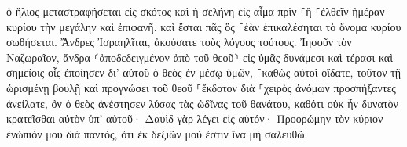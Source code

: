 \documentclass{openreader}
\begin{document}
ὁ ἥλιος μεταστραφήσεται εἰς σκότος καὶ ἡ σελήνη εἰς αἷμα πρὶν ⸀ἢ ⸀ἐλθεῖν ἡμέραν κυρίου τὴν μεγάλην καὶ ἐπιφανῆ. 
καὶ ἔσται πᾶς ὃς ⸀ἐὰν ἐπικαλέσηται τὸ ὄνομα κυρίου σωθήσεται. 
Ἄνδρες Ἰσραηλῖται, ἀκούσατε τοὺς λόγους τούτους. Ἰησοῦν τὸν Ναζωραῖον, ἄνδρα ⸂ἀποδεδειγμένον ἀπὸ τοῦ θεοῦ⸃ εἰς ὑμᾶς δυνάμεσι καὶ τέρασι καὶ σημείοις οἷς ἐποίησεν δι’ αὐτοῦ ὁ θεὸς ἐν μέσῳ ὑμῶν, ⸀καθὼς αὐτοὶ οἴδατε, 
τοῦτον τῇ ὡρισμένῃ βουλῇ καὶ προγνώσει τοῦ θεοῦ ⸀ἔκδοτον διὰ ⸀χειρὸς ἀνόμων προσπήξαντες ἀνείλατε, 
ὃν ὁ θεὸς ἀνέστησεν λύσας τὰς ὠδῖνας τοῦ θανάτου, καθότι οὐκ ἦν δυνατὸν κρατεῖσθαι αὐτὸν ὑπ’ αὐτοῦ· 
Δαυὶδ γὰρ λέγει εἰς αὐτόν· Προορώμην τὸν κύριον ἐνώπιόν μου διὰ παντός, ὅτι ἐκ δεξιῶν μού ἐστιν ἵνα μὴ σαλευθῶ. 
\end{document}

